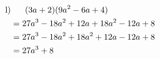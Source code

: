 \begin{exercise}
{\begin{equation*}
\begin{split}
        \end{split}
      \end{equation*}
    }%
    \newcommand{\solutionL}[1]
    {%
      \begin{equation*}
        \begin{split}
          \text{l)} &\toprow[#1]{(3a+2)(9a^2-6a+4)}          \\
                    &=           27a^3-18a^2+12a+18a^2-12a+8 \\
                    &=           27a^3-18a^2+18a^2+12a-12a+8 \\
                    &=           27a^3+8
        \end{split}
      \end{equation*}
    }%

    \begin{minipage}[t]{0.49\textwidth}
      \small
      \solutionA{20em}
    \end{minipage}%
    \hfill
    \begin{minipage}[t]{0.49\textwidth}
      \small
      \solutionB{20em}
    \end{minipage}%

    \begin{minipage}[t]{0.49\textwidth}
      \small
      \solutionC{20em}
    \end{minipage}%
    \hfill
    \begin{minipage}[t]{0.49\textwidth}
      \small
      \solutionD{20em}
    \end{minipage}%

    \begin{minipage}[t]{0.49\textwidth}
      \small
      \solutionE{20em}
    \end{minipage}%
    \hfill
    \begin{minipage}[t]{0.49\textwidth}
      \small
      \solutionF{20em}
    \end{minipage}%

    \begin{minipage}[t]{0.49\textwidth}
      \small
      \solutionG{20em}
    \end{minipage}%
    \hfill
    \begin{minipage}[t]{0.49\textwidth}
      \small
      \solutionH{20em}
    \end{minipage}%

    \begin{minipage}[t]{0.49\textwidth}
      \small
      \solutionI{20em}
    \end{minipage}%
    \hfill
    \begin{minipage}[t]{0.49\textwidth}
      \small
      \solutionJ{20em}
    \end{minipage}%

    \begin{minipage}[t]{0.49\textwidth}
      \small
      \solutionK{20em}
    \end{minipage}%
    \hfill
    \begin{minipage}[t]{0.49\textwidth}
      \small
      \solutionL{20em}
    \end{minipage}%

  \fi
\end{exercise}
